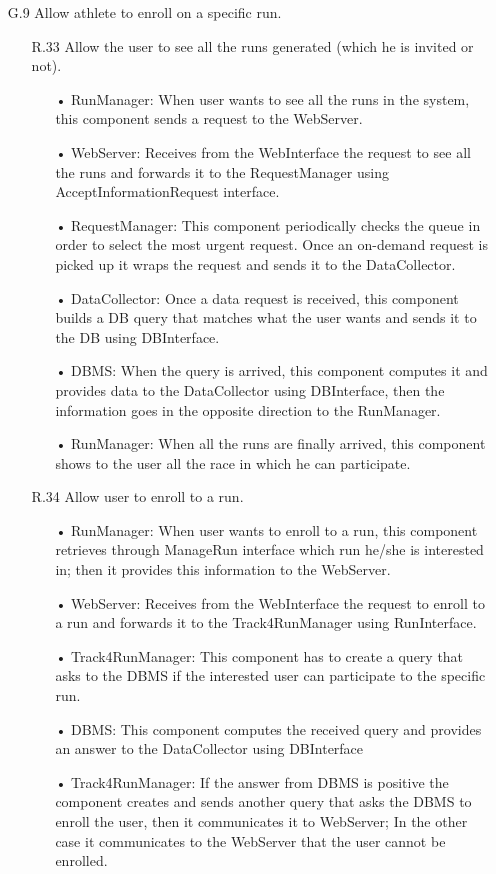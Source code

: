 \begin{enumerate}
\item [G.9] Allow athlete to enroll on a specific run.
	\begin{enumerate}
	\item [R.33] Allow the user to see all the runs generated (which he is invited or not).
		\begin{enumerate}
		\item[•] RunManager: When user wants to see all the runs in the system, this component sends a request to the WebServer.
		\item[•] WebServer: Receives from the WebInterface the request to see all the runs and forwards it to the RequestManager using AcceptInformationRequest interface.
		\item[•] RequestManager: This component periodically checks the queue in order to select the most urgent request. Once an on-demand request is picked up it wraps the request and sends it to the DataCollector.
		\item[•] DataCollector: Once a data request is received, this component builds a DB query that matches what the user wants and sends it to the DB using DBInterface.
		\item[•] DBMS: When the query is arrived, this component computes it and provides data to the DataCollector using DBInterface, then the information goes in the opposite direction to the RunManager.
		\item[•] RunManager: When all the runs are finally arrived, this component shows to the user all the race in which he can participate.
		\end{enumerate}	
	\item [R.34] Allow user to enroll to a run.
		\begin{enumerate}
		\item[•] RunManager: When user wants to enroll to a run, this component retrieves through ManageRun interface which run he/she is interested in; then it provides this information to the WebServer.
		\item[•] WebServer: Receives from the WebInterface the request to enroll to a run and forwards it to the Track4RunManager using RunInterface.
		\item[•] Track4RunManager: This component has to create a query that asks to the DBMS if the interested user can participate to the specific run.
		\item[•] DBMS: This component computes the received query and provides an answer to the DataCollector using DBInterface
		\item[•] Track4RunManager: If the answer from DBMS is positive the component creates and sends another query that asks the DBMS to enroll the user, then it communicates it to WebServer; In the other case it communicates to the WebServer that the user cannot be enrolled.

\end{enumerate}
\end{enumerate}
\end{enumerate}

